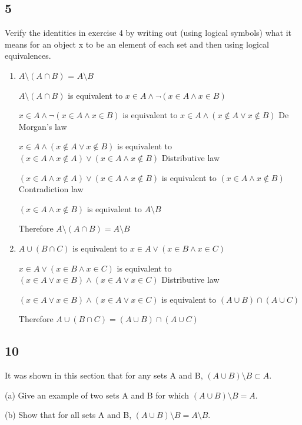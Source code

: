 \documentclass{article}
\begin{document}
\subsection{5}
Verify the identities in exercise 4 by writing out (using logical
symbols) what it means for an object x to be an element of each set
and then using logical equivalences.
\begin{enumerate}[label=(\alph*)]
    \item 
    $A\setminus (A \cap B)$ = $A \setminus B$
    
    $A\setminus (A \cap B)$ is equivalent to $x \in A \land \neg (x \in A \land x \in B)$
    
    $x \in A \land \neg (x \in A \land x \in B)$ is equivalent to $x \in A \land  (x \notin A \lor x \notin B)$ De Morgan's law
    
    $x \in A \land  (x \notin A \lor x \notin B)$ is equivalent to $(x \in A \land  x \notin A) \lor (x \in A \land x \notin B)$ Distributive law
    
     $(x \in A \land  x \notin A) \lor (x \in A \land x \notin B)$ is equivalent to $(x \in A \land x \notin B)$ Contradiction law
     
     $(x \in A \land x \notin B)$ is equivalent to $A \setminus B$
     
     Therefore $A\setminus (A \cap B) = A \setminus B$
    \item
    $A \cup (B \cap C)$ is equivalent to $x \in A \lor (x \in B \land x \in C)$
    
    $x \in A \lor (x \in B \land x \in C)$ is equivalent to $(x \in A \lor x \in B ) \land (x \in A \lor x \in C)$ Distributive law
    
    $(x \in A \lor x \in B ) \land (x \in A \lor x \in C)$ is equivalent to $(A \cup B) \cap (A \cup C)$ 
    
    Therefore $A \cup (B \cap C) = (A \cup B) \cap (A \cup C)$
\end{enumerate}
\subsection{10}
It was shown in this section that for any sets A and B, $(A \cup B) \setminus B \subset A$.

(a) Give an example of two sets A and B for which $(A \cup B) \setminus B = A$.

(b) Show that for all sets A and B, $(A \cup B) \setminus B = A \setminus B$.
\end{document}
